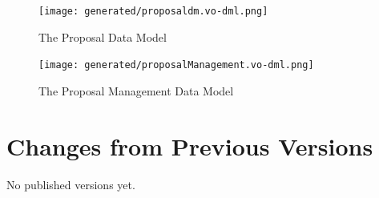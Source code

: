 \documentclass[10pt,a4paper]{ivoa}
\begin{document}


\begin{figure}
    \centering
\texttt{[image: generated/proposaldm.vo-dml.png]}
\caption{The Proposal Data Model}
\label{fig:propdm}
\end{figure}


\begin{figure}
    \centering
    \texttt{[image: generated/proposalManagement.vo-dml.png]}
    \caption{The Proposal Management Data Model}
    \label{fig:propmdm}
\end{figure}



\appendix
\section{Changes from Previous Versions}

No published versions yet.



\end{document}
